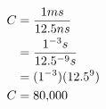 \documentclass[preview,border=3mm]{standalone}
\begin{document}
\begin{align*}
    C &= \frac{1ms}{12.5ns}\cr
      &= \frac{1^{-3}s}{12.5^{-9}s}\cr
      &= (1^{-3})(12.5^{9})\cr
    C &= 80,\!000
\end{align*}
\end{document}
